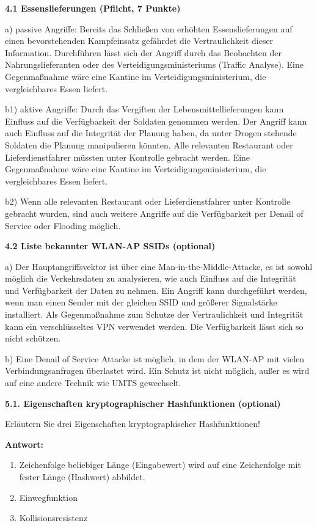 \documentclass[ngerman]{fbi-aufgabenblatt}
\begin{document}
%
%
\newpage
{}

\textbf{4.1 Essenslieferungen (Pflicht, 7 Punkte)}

a) passive Angriffe: Bereits das Schließen von erhöhten Essenslieferungen auf einen bevorstehenden Kampfeinsatz gefährdet die Vertraulichkeit dieser Information. Durchführen lässt sich der Angriff durch das Beobachten der Nahrungslieferanten oder des Verteidigungsministeriums (Traffic Analyse). Eine Gegenmaßnahme wäre eine Kantine im Verteidigungsministerium, die vergleichbares Essen liefert. 

b1) aktive Angriffe: Durch das Vergiften der Lebensmittellieferungen kann Einfluss auf die Verfügbarkeit der Soldaten genommen werden. Der Angriff kann auch Einfluss auf die Integrität der Planung haben, da unter Drogen stehende Soldaten die Planung manipulieren könnten. Alle relevanten Restaurant oder Lieferdienstfahrer müssten unter Kontrolle gebracht werden. Eine Gegenmaßnahme wäre eine Kantine im Verteidigungsministerium, die vergleichbares Essen liefert.
 
b2) Wenn alle relevanten Restaurant oder Lieferdienstfahrer unter Kontrolle gebracht wurden, sind auch weitere Angriffe auf die Verfügbarkeit per Denail of Service oder Flooding möglich.

\textbf{4.2 Liste bekannter WLAN-AP SSIDs (optional)}

a) Der Hauptangriffsvektor ist über eine Man-in-the-Middle-Attacke, es ist sowohl möglich die Verkehrsdaten zu analysieren, wie auch Einfluss auf die Integrität und Verfügbarkeit der Daten zu nehmen. Ein Angriff kann durchgeführt werden, wenn man einen Sender mit der gleichen SSID und größerer Signalstärke installiert.
Als Gegenmaßnahme zum Schutze der Vertraulichkeit und Integrität kann ein verschlüsseltes VPN verwendet werden. Die Verfügbarkeit lässt sich so nicht schützen.

b) Eine Denail of Service Attacke ist möglich, in dem der WLAN-AP mit vielen Verbindungsanfragen überlastet wird. Ein Schutz ist nicht möglich, außer es wird auf eine andere Technik wie UMTS gewechselt. 


\newpage
{}

\textbf{5.1. Eigenschaften kryptographischer Hashfunktionen (optional)}

Erläutern Sie drei Eigenschaften kryptographischer Hashfunktionen!

\textbf{Antwort:}
    \begin{enumerate}
    \item Zeichenfolge beliebiger Länge (Eingabewert) wird auf eine Zeichenfolge mit fester Länge (Hashwert) abbildet.
    \item Einwegfunktion
    \item Kollisionsresistenz
    \end{enumerate}
\end{document}
